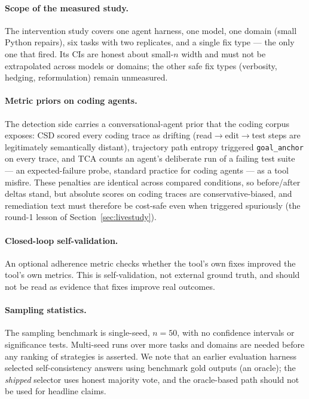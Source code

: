 \documentclass[11pt]{article}
\newcommand{\code}[1]{\texttt{#1}}
\begin{document}
\paragraph{Scope of the measured study.} The intervention study covers one
agent harness, one model, one domain (small Python repairs), six tasks with
two replicates, and a single fix type --- the only one that fired. Its CIs are
honest about small-$n$ width and must not be extrapolated across models or
domains; the other safe fix types (verbosity, hedging, reformulation) remain
unmeasured.

\paragraph{Metric priors on coding agents.} The detection side carries a
conversational-agent prior that the coding corpus exposes: CSD scored every
coding trace as drifting (read$\to$edit$\to$test steps are legitimately
semantically distant), trajectory path entropy triggered \code{goal\_anchor}
on every trace, and TCA counts an agent's deliberate run of a failing test
suite --- an expected-failure probe, standard practice for coding agents ---
as a tool misfire. These penalties are identical across compared conditions,
so before/after deltas stand, but absolute scores on coding traces are
conservative-biased, and remediation text must therefore be cost-safe even
when triggered spuriously (the round-1 lesson of
Section~\ref{sec:livestudy}).

\paragraph{Closed-loop self-validation.} An optional adherence metric checks
whether the tool's own fixes improved the tool's own metrics. This is
self-validation, not external ground truth, and should not be read as evidence
that fixes improve real outcomes.

\paragraph{Sampling statistics.} The sampling benchmark is single-seed,
$n=50$, with no confidence intervals or significance tests. Multi-seed runs over
more tasks and domains are needed before any ranking of strategies is asserted.
We note that an earlier evaluation harness selected self-consistency answers
using benchmark gold outputs (an oracle); the \emph{shipped} selector uses honest
majority vote, and the oracle-based path should not be used for headline claims.
\end{document}
